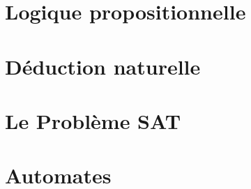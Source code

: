 \documentclass[a4paper, 12pt]{extarticle}
\begin{document}


\makemargins %
\makefrontpage
\maketoc


% 



\section{Logique propositionnelle}
\label{sec:logique_propositionnelle}

\newpage


\section{Déduction naturelle}
\label{sec:déduction_naturelle}

\newpage


\section{Le Problème SAT}
\label{sec:sat}

\newpage

\section{Automates}
\label{sec:automates}

\newpage

\end{document}

